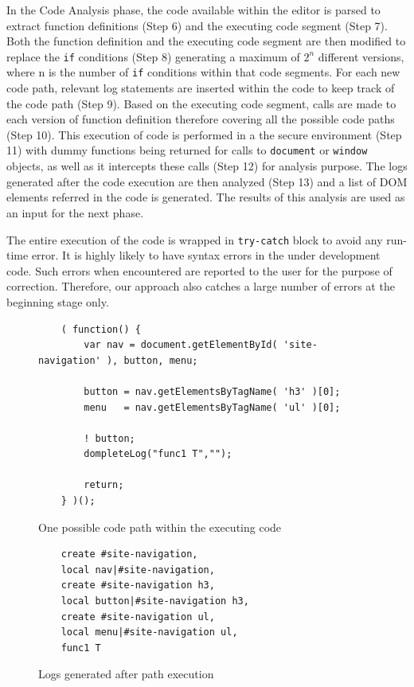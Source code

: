 		In the Code Analysis phase, the \javascript code available within the editor is parsed to extract function definitions (Step 6) and the executing code segment (Step 7). Both the function definition and the executing code segment are then modified to replace the \texttt{if} conditions (Step 8) generating a maximum of $2^n$ different versions, where n is the number of \texttt{if} conditions within that code segments. For each new code path, relevant log statements are inserted within the code to keep track of the code path (Step 9). Based on the executing code segment, calls are made to each version of function definition therefore covering all the possible code paths (Step 10). This execution of \javascript code is performed in a the secure environment (Step 11) with dummy functions being returned for calls to \texttt{document} or \texttt{window} objects, as well as it intercepts these calls (Step 12) for analysis purpose. The logs generated after the code execution are then analyzed (Step 13) and a list of DOM elements referred in the code is generated. The results of this analysis are used as an input for the next phase.
		
		The entire execution of the code is wrapped in \texttt{try-catch} block to avoid any run-time error. It is highly likely to have syntax errors in the under development code. Such errors when encountered are reported to the user for the purpose of correction. Therefore, our approach also catches a large number of errors at the beginning stage only.
		
		
		\begin{figure}
			\medskip
			\begin{lstlisting}
	( function() {
		var nav = document.getElementById( 'site-navigation' ), button, menu;
		
		button = nav.getElementsByTagName( 'h3' )[0];
		menu   = nav.getElementsByTagName( 'ul' )[0];

		! button;
		dompleteLog("func1 T","");
		
		return;
	} )();
			\end{lstlisting}
			\caption{One possible code path within the executing code}
			\label{Fig:Path}
			\end{figure}
			
			
			\begin{figure}
			\medskip
			\begin{lstlisting}
	create #site-navigation, 
	local nav|#site-navigation, 
	create #site-navigation h3, 
	local button|#site-navigation h3, 
	create #site-navigation ul, 
	local menu|#site-navigation ul, 
	func1 T 
			\end{lstlisting}
			\caption{Logs generated after path execution}
			\label{Fig:Logs}
			\end{figure}
			
